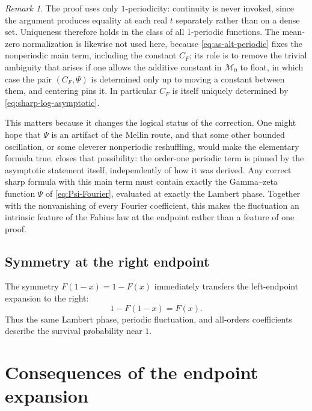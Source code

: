 \documentclass[11pt,oneside]{article}
\theoremstyle{definition}
\theoremstyle{remark}
\newtheorem{remark}[theorem]{Remark}
\begin{document}
\begin{remark}
\label{rem:as-uniqueness-hypotheses}
The proof uses only $1$-periodicity: continuity is never invoked, since the argument produces
equality at each real $t$ separately rather than on a dense set.  Uniqueness therefore holds
in the class of all $1$-periodic functions.  The mean-zero normalization is likewise not used
here, because \eqref{eq:as-alt-periodic} fixes the nonperiodic main term, including the
constant $C_F$; its role is to remove the trivial ambiguity that arises if one allows the
additive constant in $\mathcal M_0$ to float, in which case the pair $(C_F,\Psi)$ is
determined only up to moving a constant between them, and centering pins it.  In particular
$C_F$ is itself uniquely determined by \eqref{eq:sharp-log-asymptotic}.
\end{remark}

This matters because it changes the logical status of the correction.  One might hope that
$\Psi$ is an artifact of the Mellin route, and that some other bounded oscillation, or some
cleverer nonperiodic reshuffling, would make the elementary formula true.
 closes that possibility: the order-one periodic term is pinned by the
asymptotic statement itself, independently of how it was derived.  Any correct sharp formula
with this main term must contain exactly the Gamma--zeta function $\Psi$ of
\eqref{eq:Psi-Fourier}, evaluated at exactly the Lambert phase.  Together with the
nonvanishing of every Fourier coefficient, this makes the fluctuation an intrinsic feature of
the Fabius law at the endpoint rather than a feature of one proof.

\subsection{Symmetry at the right endpoint}

The symmetry $F(1-x)=1-F(x)$ immediately transfers the left-endpoint expansion to the right:
\begin{equation}
 1-F(1-x)=F(x).                                            \label{eq:right-endpoint-sym}
\end{equation}
Thus the same Lambert phase, periodic fluctuation, and all-orders coefficients describe the
survival probability near $1$.

\section{Consequences of the endpoint expansion}
\label{sec:asymptotic-consequences}
\end{document}
